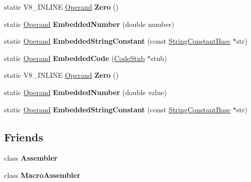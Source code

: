 \begin{DoxyCompactItemize}
static V8\+\_\+\+I\+N\+L\+I\+NE \mbox{\hyperlink{classv8_1_1internal_1_1Operand}{Operand}} {\bfseries Zero} ()
\item 
\mbox{\label{classv8_1_1internal_1_1Operand_acf6f1fd77d9ac5d43608db185e9ee29b}} 
static \mbox{\hyperlink{classv8_1_1internal_1_1Operand}{Operand}} {\bfseries Embedded\+Number} (double number)
\item 
\mbox{\label{classv8_1_1internal_1_1Operand_aed8c3e6c09f724bdfb40c4705b89bc83}} 
static \mbox{\hyperlink{classv8_1_1internal_1_1Operand}{Operand}} {\bfseries Embedded\+String\+Constant} (const \mbox{\hyperlink{classv8_1_1internal_1_1StringConstantBase}{String\+Constant\+Base}} $\ast$str)
\item 
\mbox{\label{classv8_1_1internal_1_1Operand_a3c9527809810de0034efe67b914f9ee1}} 
static \mbox{\hyperlink{classv8_1_1internal_1_1Operand}{Operand}} {\bfseries Embedded\+Code} (\mbox{\hyperlink{classv8_1_1internal_1_1CodeStub}{Code\+Stub}} $\ast$stub)
\item 
\mbox{\label{classv8_1_1internal_1_1Operand_af63e5b52f98f22839e89fd46fb9a412b}} 
static V8\+\_\+\+I\+N\+L\+I\+NE \mbox{\hyperlink{classv8_1_1internal_1_1Operand}{Operand}} {\bfseries Zero} ()
\item 
\mbox{\label{classv8_1_1internal_1_1Operand_a5c5472d96f57a54256f0a0ab449bb52b}} 
static \mbox{\hyperlink{classv8_1_1internal_1_1Operand}{Operand}} {\bfseries Embedded\+Number} (double value)
\item 
\mbox{\label{classv8_1_1internal_1_1Operand_aed8c3e6c09f724bdfb40c4705b89bc83}} 
static \mbox{\hyperlink{classv8_1_1internal_1_1Operand}{Operand}} {\bfseries Embedded\+String\+Constant} (const \mbox{\hyperlink{classv8_1_1internal_1_1StringConstantBase}{String\+Constant\+Base}} $\ast$str)
\end{DoxyCompactItemize}
\subsection*{Friends}
\begin{DoxyCompactItemize}
\item 
\mbox{\label{classv8_1_1internal_1_1Operand_ab679df99d1569d09fdf3358620a4ad34}} 
class {\bfseries Assembler}
\item 
\mbox{\label{classv8_1_1internal_1_1Operand_a08fd3eef827fdec5b4bb544beb64e19d}} 
class {\bfseries Macro\+Assembler}
\end{DoxyCompactItemize}


